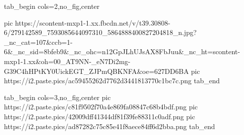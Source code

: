  
 
 
 
 

\ifcmt
  tab_begin cols=2,no_fig,center

     pic https://scontent-mxp1-1.xx.fbcdn.net/v/t39.30808-6/279142589_7593085644097310_5864888400827204818_n.jpg?_nc_cat=107&ccb=1-6&_nc_sid=8bfeb9&_nc_ohc=n12GpJLhUJsAX8FbJuu&_nc_ht=scontent-mxp1-1.xx&oh=00_AT9NN-_eN7Di2mg-G39C4hHPtKY0UickEGT_ZJPmQBKNFA&oe=627DD6BA
		 pic https://i2.paste.pics/ac59455262d7762d3441813770c1bc7c.png
  tab_end
\fi

\ifcmt
  tab_begin cols=3,no_fig,center
		 pic https://i2.paste.pics/c81f9502f70a4e869fa08847c68b4bdf.png
		 pic https://i2.paste.pics/42009dff41344df81f39fe88311c0adf.png
		 pic https://i2.paste.pics/ad87282c75c85e41f8aece84ff6d2bba.png
  tab_end
\fi
